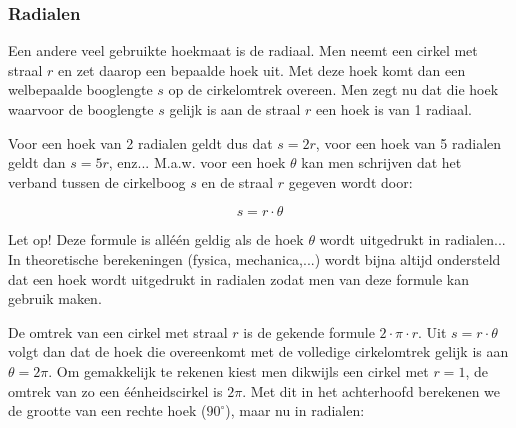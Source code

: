 \subsubsection{Radialen}

Een andere veel gebruikte hoekmaat is de radiaal. Men neemt een cirkel met straal $r$ en zet daarop een bepaalde hoek uit. Met deze hoek komt dan een welbepaalde booglengte $s$ op de cirkelomtrek overeen. Men zegt nu dat die hoek waarvoor de booglengte $s$ gelijk is aan de straal $r$ een hoek is van 1 radiaal.




Voor een hoek van 2 radialen geldt dus dat $s=2r$, voor een hoek van 5 radialen geldt dan $s=5r$, enz... M.a.w. voor een hoek $\theta$ kan men schrijven dat het verband tussen de cirkelboog $s$ en de straal $r$ gegeven wordt door:

\[ s=r\cdot \theta \]

Let op! Deze formule is all\'{e}\'{e}n geldig als de hoek $\theta$ wordt uitgedrukt in radialen...\\

In theoretische berekeningen (fysica, mechanica,...) wordt bijna altijd ondersteld dat een hoek wordt uitgedrukt in radialen zodat men van deze formule kan gebruik maken.

De omtrek van een cirkel met straal $r$ is de gekende formule $2\cdot \pi \cdot r$. Uit $s=r\cdot \theta$ volgt dan dat de hoek die overeenkomt met de volledige cirkelomtrek gelijk is aan $\theta=2\pi$. Om gemakkelijk te rekenen kiest men dikwijls een cirkel met $r=1$, de omtrek van zo een \'{e}\'{e}nheidscirkel is $2\pi$.  Met dit in het achterhoofd berekenen we de grootte van een rechte hoek ($90^\circ$), maar nu in radialen:



